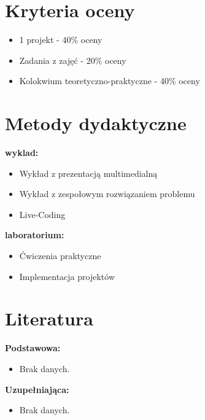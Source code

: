 \documentclass[12pt, a4paper]{article}
\begin{document}
\section{Kryteria oceny}

\begin{itemize}
  \item 1 projekt - 40\% oceny
  \item Zadania z zajęć - 20\% oceny
  \item Kolokwium teoretyczno-praktyczne - 40\% oceny
\end{itemize}

\section{Metody dydaktyczne}

\textbf{wyklad:}
\begin{itemize}
  \item Wykład z prezentacją multimedialną
  \item Wykład z zespołowym rozwiązaniem problemu
  \item Live-Coding
\end{itemize}
\vspace{4pt}
\textbf{laboratorium:}
\begin{itemize}
  \item Ćwiczenia praktyczne
  \item Implementacja projektów
\end{itemize}
\vspace{4pt}


\section{Literatura}

\textbf{Podstawowa:}
\begin{itemize}
  \item Brak danych.
\end{itemize}

\textbf{Uzupełniająca:}
\begin{itemize}
  \item Brak danych.
\end{itemize}
\end{document}
